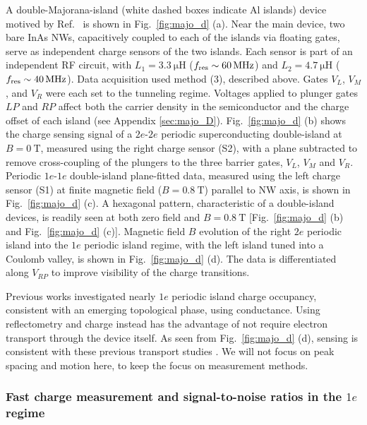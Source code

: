 A double-Majorana-island (white dashed boxes indicate Al islands) device motived by Ref.~\cite{AasenPRX16} is shown in Fig.~\ref{fig:majo_d} (a). Near the main device, two bare InAs NWs, capacitively coupled to each of the islands via floating gates, serve as independent charge sensors of the two islands. Each sensor is part of an independent RF circuit, with $L_{1} = \SI{3.3}{\micro\henry}$ ($f_{\rm res} \sim \SI{60}{\mega\hertz}$) and $L_{2} = \SI{4.7}{\micro\henry}$ ($f_{\rm res} \sim \SI{40}{\mega\hertz}$). Data acquisition used method (3), described above. Gates $V_{L}$, $V_{M}$, and $V_{R}$ were each set to the tunneling regime. Voltages applied to plunger gates $LP$ and $RP$ affect both the carrier density in the semiconductor and the charge offset of each island (see Appendix \ref{sec:majo_D}). Fig.~\ref{fig:majo_d} (b) shows the charge sensing signal of a $2e$-$2e$ periodic superconducting double-island at $B = \SI{0}{\tesla}$, measured using the right charge sensor (S2), with a plane subtracted to remove cross-coupling of the plungers to the three barrier gates, $V_{L}$, $V_{M}$ and $V_{R}$.  Periodic $1e$-$1e$ double-island plane-fitted data, measured using the left charge sensor (S1) at finite magnetic field ($B = \SI{0.8}{\tesla}$) parallel to NW axis, is shown in Fig.~\ref{fig:majo_d} (c). A hexagonal pattern, characteristic of a double-island devices, is readily seen at both zero field and $B = \SI{0.8}{\tesla}$  [Fig.~\ref{fig:majo_d} (b) and Fig.~\ref{fig:majo_d} (c)]. Magnetic field $B$ evolution of the right $2e$ periodic island into the $1e$ periodic island regime, with the left island tuned into a Coulomb valley, is shown in Fig.~\ref{fig:majo_d} (d). The data is differentiated along $V_{RP}$ to improve visibility of the charge transitions.

Previous works \cite{AlbretchNature,sherman} investigated nearly $1e$ periodic island charge occupancy, consistent with an emerging topological phase, using conductance. Using reflectometry and charge instead has  the advantage of not require electron transport through the  device itself. As seen from Fig.~\ref{fig:majo_d} (d), sensing is consistent with these previous transport studies \cite{AlbretchNature}. We will not focus on peak spacing and motion here, to keep the focus on measurement methods.

\subsubsection{Fast charge measurement and signal-to-noise ratios in the \texorpdfstring{$1e$}{1e} regime}

